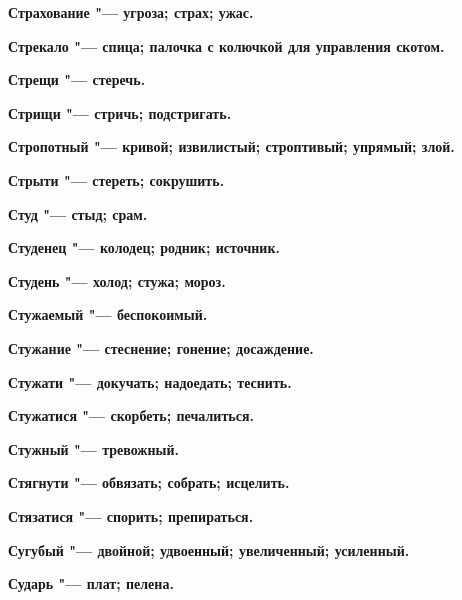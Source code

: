 \begin{multicols}{2}
\bfseries Страхование\normalfont{} "--- угроза; страх; ужас. 




\bfseries Стрекало\normalfont{} "--- спица; палочка с колючкой для управления скотом. 




\bfseries Стрещи\normalfont{} "--- стеречь. 




\bfseries Стрищи\normalfont{} "--- стричь; подстригать. 




\bfseries Стропотный\normalfont{} "--- кривой; извилистый; строптивый; упрямый; злой. 




\bfseries Стрыти\normalfont{} "--- стереть; сокрушить. 




\bfseries Студ\normalfont{} "--- стыд; срам. 




\bfseries Студенец\normalfont{} "--- колодец; родник; источник. 




\bfseries Студень\normalfont{} "--- холод; стужа; мороз. 




\bfseries Стужаемый\normalfont{} "--- беспокоимый. 




\bfseries Стужание\normalfont{} "--- стеснение; гонение; досаждение. 




\bfseries Стужати\normalfont{} "--- докучать; надоедать; теснить. 




\bfseries Стужатися\normalfont{} "--- скорбеть; печалиться. 




\bfseries Стужный\normalfont{} "--- тревожный. 




\bfseries Стягнути\normalfont{} "--- обвязать; собрать; исцелить. 




\bfseries Стязатися\normalfont{} "--- спорить; препираться. 




\bfseries Сугубый\normalfont{} "--- двойной; удвоенный; увеличенный; усиленный. 




\bfseries Сударь\normalfont{} "--- плат; пелена. 





\end{multicols}
